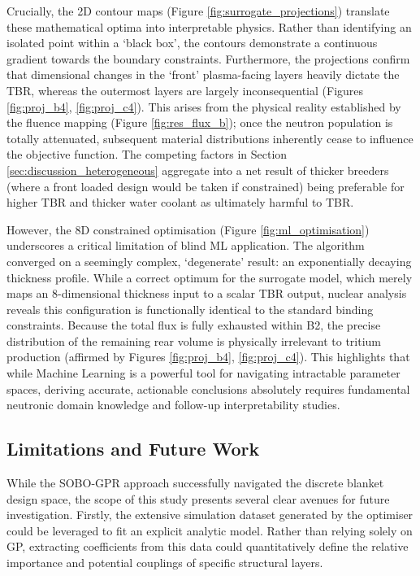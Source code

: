 \documentclass[11pt]{article}
\begin{document}
Crucially, the 2D contour maps (Figure \ref{fig:surrogate_projections}) translate these mathematical
optima into interpretable physics. Rather than identifying an isolated point within a `black box',
the contours demonstrate a continuous gradient towards the boundary constraints. Furthermore, the
projections confirm that dimensional changes in the `front' plasma-facing layers heavily dictate the
TBR, whereas the outermost layers are largely inconsequential (Figures \ref{fig:proj_b4},
\ref{fig:proj_c4}). This arises from the physical reality established by the fluence mapping (Figure
\ref{fig:res_flux_b}); once the neutron population is totally attenuated, subsequent material
distributions inherently cease to influence the objective function. The competing factors in Section
\ref{sec:discussion_heterogeneous} aggregate into a net result of thicker breeders (where a front
loaded design would be taken if constrained) being preferable for higher TBR and thicker water
coolant as ultimately harmful to TBR.

However, the 8D constrained optimisation (Figure \ref{fig:ml_optimisation}) underscores a critical
limitation of blind ML application. The algorithm converged on a seemingly complex, `degenerate'
result: an exponentially decaying thickness profile. While a correct optimum for the surrogate
model, which merely maps an 8-dimensional thickness input to a scalar TBR output, nuclear analysis
reveals this configuration is functionally identical to the standard binding constraints. Because
the total flux is fully exhausted within B2, the precise distribution of the remaining rear volume
is physically irrelevant to tritium production (affirmed by Figures \ref{fig:proj_b4},
\ref{fig:proj_c4}). This highlights that while Machine Learning is a powerful tool for navigating
intractable parameter spaces, deriving accurate, actionable conclusions absolutely requires
fundamental neutronic domain knowledge and follow-up interpretability studies.

\subsection{Limitations and Future Work}
\label{sec:discussion_limitations}

While the SOBO-GPR approach successfully navigated the discrete blanket design space, the scope of
this study presents several clear avenues for future investigation. Firstly, the extensive
simulation dataset generated by the optimiser could be leveraged to fit an explicit analytic model.
Rather than relying solely on GP, extracting coefficients from this data could quantitatively define
the relative importance and potential couplings of specific structural layers.
\end{document}
